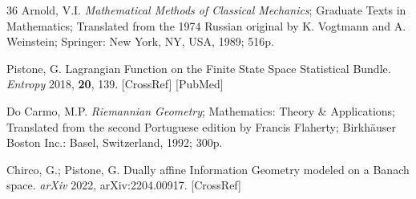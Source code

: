 \documentclass[12pt]{article}
\begin{document}
\begin{thebibliography}{36}
Arnold, V.I. \textit{Mathematical Methods of Classical Mechanics}; Graduate Texts in Mathematics;
Translated from the 1974 Russian original by K. Vogtmann and A. Weinstein;
Springer: New York, NY, USA, 1989; 516p.

Pistone, G. Lagrangian Function on the Finite State Space Statistical Bundle.
\textit{Entropy} 2018, \textbf{20}, 139. [CrossRef] [PubMed]

Do Carmo, M.P. \textit{Riemannian Geometry}; Mathematics: Theory \& Applications;
Translated from the second Portuguese edition by Francis Flaherty;
Birkhäuser Boston Inc.: Basel, Switzerland, 1992; 300p.

Chirco, G.; Pistone, G. Dually affine Information Geometry modeled on a Banach space.
\textit{arXiv} 2022, arXiv:2204.00917. [CrossRef]

\end{thebibliography}
\end{document}
